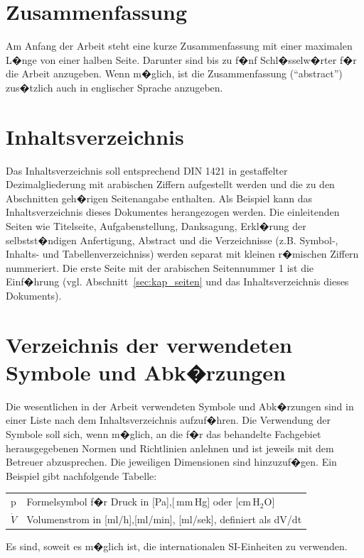 \section{Zusammenfassung}
Am Anfang der Arbeit steht eine kurze Zusammenfassung mit einer maximalen L�nge von einer
halben Seite. Darunter sind bis zu f�nf Schl�sselw�rter f�r die Arbeit anzugeben. Wenn
m�glich, ist die Zusammenfassung ("`abstract"') zus�tzlich auch in englischer Sprache anzugeben.

\section{Inhaltsverzeichnis}
Das Inhaltsverzeichnis soll entsprechend DIN 1421 in gestaffelter Dezimalgliederung mit
arabischen Ziffern aufgestellt werden und die zu den Abschnitten geh�rigen Seitenangabe
enthalten. Als Beispiel kann das Inhaltsverzeichnis dieses Dokumentes herangezogen werden.
Die einleitenden Seiten wie Titelseite, Aufgabenstellung, Danksagung, Erkl�rung der selbstst�ndigen Anfertigung, Abstract und die Verzeichnisse (z.B. Symbol-, Inhalts- und Tabellenverzeichniss) werden separat mit kleinen r�mischen Ziffern nummeriert. Die erste Seite mit der arabischen Seitennummer 1 ist die Einf�hrung (vgl. Abschnitt~\ref{sec:kap_seiten} und das Inhaltsverzeichnis dieses Dokuments).


\section{Verzeichnis der verwendeten Symbole und Abk�rzungen}

Die wesentlichen in der Arbeit verwendeten Symbole und Abk�rzungen sind in einer Liste nach dem
Inhaltsverzeichnis aufzuf�hren. Die Verwendung der Symbole soll sich, wenn m�glich, an die f�r das
behandelte Fachgebiet herausgegebenen Normen und Richtlinien anlehnen und ist jeweils mit dem
Betreuer abzusprechen. Die jeweiligen Dimensionen sind hinzuzuf�gen. Ein Beispiel gibt nachfolgende
Tabelle:

\begin{table}[!ht]
  \centering
  \vspace{5mm}
  \begin{tabular}{|ll|}
                                 \hline
                                  p & Formelsymbol f�r Druck in [Pa],[$\,$mm$\,$Hg] oder [cm$\,$H$_2$O]\\
                                  $\dot V$ & Volumenstrom in [ml/h],[ml/min], [ml/sek], definiert als dV/dt\\
                                 \hline
  \end{tabular}

  \label{tab:AngabeVonSymbolen}
\end{table}
Es sind, soweit es m�glich ist, die internationalen SI-Einheiten zu verwenden.

